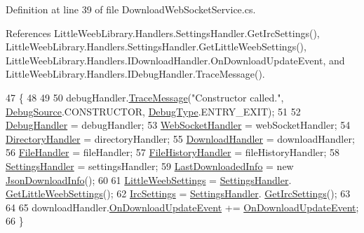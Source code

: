 Definition at line 39 of file Download\+Web\+Socket\+Service.\+cs.



References Little\+Weeb\+Library.\+Handlers.\+Settings\+Handler.\+Get\+Irc\+Settings(), Little\+Weeb\+Library.\+Handlers.\+Settings\+Handler.\+Get\+Little\+Weeb\+Settings(), Little\+Weeb\+Library.\+Handlers.\+I\+Download\+Handler.\+On\+Download\+Update\+Event, and Little\+Weeb\+Library.\+Handlers.\+I\+Debug\+Handler.\+Trace\+Message().


\begin{DoxyCode}
47         \{
48             
49 
50             debugHandler.\mbox{\hyperlink{interface_little_weeb_library_1_1_handlers_1_1_i_debug_handler_a2e405bc3492e683cd3702fae125221bc}{TraceMessage}}(\textcolor{stringliteral}{"Constructor called."}, 
      \mbox{\hyperlink{namespace_little_weeb_library_1_1_handlers_a2a6ca0775121c9c503d58aa254d292be}{DebugSource}}.CONSTRUCTOR, \mbox{\hyperlink{namespace_little_weeb_library_1_1_handlers_ab66019ed40462876ec4e61bb3ccb0a62}{DebugType}}.ENTRY\_EXIT);
51 
52             \mbox{\hyperlink{class_little_weeb_library_1_1_handlers_1_1_debug_handler}{DebugHandler}} = debugHandler;
53             \mbox{\hyperlink{class_little_weeb_library_1_1_handlers_1_1_web_socket_handler}{WebSocketHandler}} = webSocketHandler;
54             \mbox{\hyperlink{class_little_weeb_library_1_1_handlers_1_1_directory_handler}{DirectoryHandler}} = directoryHandler;
55             \mbox{\hyperlink{class_little_weeb_library_1_1_handlers_1_1_download_handler}{DownloadHandler}} = downloadHandler;
56             \mbox{\hyperlink{class_little_weeb_library_1_1_handlers_1_1_file_handler}{FileHandler}} = fileHandler;
57             \mbox{\hyperlink{class_little_weeb_library_1_1_handlers_1_1_file_history_handler}{FileHistoryHandler}} = fileHistoryHandler;
58             \mbox{\hyperlink{class_little_weeb_library_1_1_handlers_1_1_settings_handler}{SettingsHandler}} = settingsHandler;
59             \mbox{\hyperlink{class_little_weeb_library_1_1_services_1_1_download_web_socket_service_a541fd25204120f3ee2b7f70deae533ce}{LastDownloadedInfo}} = \textcolor{keyword}{new} \mbox{\hyperlink{class_little_weeb_library_1_1_models_1_1_json_download_info}{JsonDownloadInfo}}();
60 
61             \mbox{\hyperlink{class_little_weeb_library_1_1_settings_1_1_little_weeb_settings}{LittleWeebSettings}} = \mbox{\hyperlink{class_little_weeb_library_1_1_handlers_1_1_settings_handler}{SettingsHandler}}.
      \mbox{\hyperlink{class_little_weeb_library_1_1_handlers_1_1_settings_handler_a53a5c5206eb6d2c58fa9d970c9b97463}{GetLittleWeebSettings}}();
62             \mbox{\hyperlink{class_little_weeb_library_1_1_settings_1_1_irc_settings}{IrcSettings}} = \mbox{\hyperlink{class_little_weeb_library_1_1_handlers_1_1_settings_handler}{SettingsHandler}}.
      \mbox{\hyperlink{class_little_weeb_library_1_1_handlers_1_1_settings_handler_a22195b5d1df129295e0e30298611bdba}{GetIrcSettings}}();
63 
64 
65             downloadHandler.\mbox{\hyperlink{interface_little_weeb_library_1_1_handlers_1_1_i_download_handler_ab1d80f17c3714758e3a605adddfe68ef}{OnDownloadUpdateEvent}} += 
      \mbox{\hyperlink{class_little_weeb_library_1_1_services_1_1_download_web_socket_service_a3111908b7f7a133a80ab6ec3e81cdcbf}{OnDownloadUpdateEvent}};
66         \}
\end{DoxyCode}
